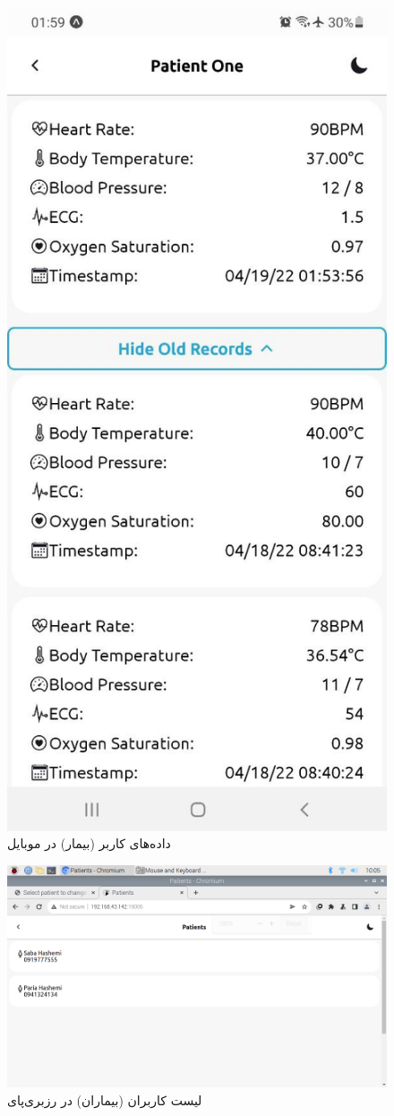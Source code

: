 \documentclass[12pt]{article}
\begin{document}
		
\begin{figure}[H]
	\begin{center}
		\includegraphics[width=.6\textwidth]{images/mobile-app.png}
	\end{center}
	\caption{داده‌های کاربر (بیمار) در موبایل}
\end{figure}

		
\begin{figure}[H]
	\begin{center}
		\includegraphics[width=.55\textwidth]{images/app1.png}
	\end{center}
	\caption{لیست کاربران (بیماران) در رزبری‌پای}
\end{figure}
\end{document}
